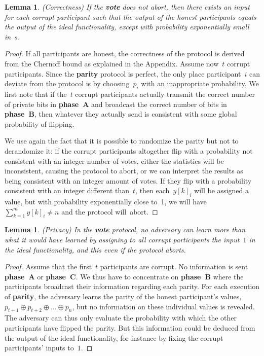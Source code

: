 \documentclass[11pt]{article}
\newtheorem{lemma}[theorem]{Lemma}
\begin{document}
\begin{lemma}(Correctness)
\label{lem:correctness corrupt} If the \textbf{vote} does not abort,
then there exists an input for each corrupt participant such that
the output of the honest participants equals the output of the ideal
functionality, except with probability exponentially small in~$s$.
\end{lemma}



\begin{proof}
If all participants are honest, the correctness of the protocol is
derived from the Chernoff bound  as explained in the Appendix.
Assume now~$t$ corrupt participants. Since the \textbf{parity}
protocol is perfect, the only place participant~$i$ can deviate from
the protocol is by choosing~$p_i$ with an inappropriate probability.
We first note that if the~$t$ corrupt participants actually transmit
the correct number of private bits in \textbf{phase~A} and broadcast
the correct number of bits in \textbf{phase~B}, then whatever they
actually send is consistent with some global probability of
flipping.

We use again the fact that it is possible to randomize the parity
but not to derandomize it: if the corrupt participants altogether
flip with a probability not consistent with an integer number of
votes, either the statistics will be inconsistent, causing the
protocol to abort, or we can interpret the results as being
consistent with an integer amount of votes. If they flip with a
probability consistent with an integer different than~$t$, then
each~$y[k]_i$ will  be assigned a value, but with probability
exponentially close to~1, we will have~$\sum_{k=1}^m y[k]_i \neq n$
and the protocol will~abort.
\end{proof}


\begin{lemma}(Privacy)
\label{lem:privacy} In the \textbf{vote} protocol, no adversary can
learn more than what it would have learned by assigning to all
corrupt participants the input~$1$ in the ideal functionality, and
this even if the protocol aborts.
\end{lemma}

\begin{proof}
Assume that the first~$t$ participants are corrupt. No information
is sent \textbf{phase~A} or \textbf{phase~C}. We thus have to
concentrate on \textbf{phase~B} where the participants broadcast
their information regarding each parity. For each execution of
\textbf{parity}, the  adversary learns the parity of the honest
participant's values, $p_{t+1} \oplus p_{t+2} \oplus \ldots \oplus
p_{n}$, but no information on these individual values is revealed.
The adversary can thus only evaluate the probability with which the
other participants have flipped the parity. But this information
could be deduced from the output of the ideal functionality, for
instance by fixing the corrupt participants' inputs to~$1$.
\end{proof}
\end{document}
